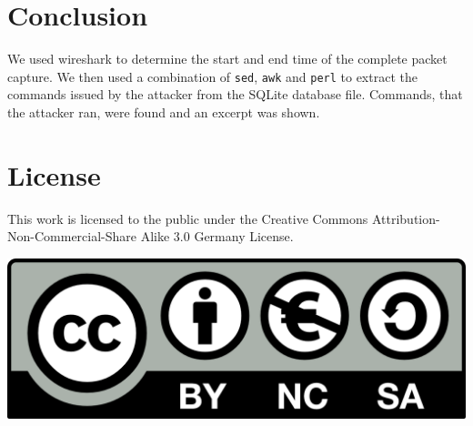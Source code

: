 \documentclass[a4paper,
    11pt,
    normalheadings,
    parindent,
    UKenglish,
    abstracton,
    ]{scrartcl}
\begin{document}
\section{Conclusion}

We used wireshark to determine the start and end time of the complete packet capture.
We then used a combination of \texttt{sed}, \texttt{awk} and \texttt{perl} to extract the commands issued by the attacker from the SQLite database file.
Commands, that the attacker ran, were found and an excerpt was shown.

% 
% 
% 
%
%

\section*{License}
This work is licensed to the public under the Creative Commons Attribution-Non-Commercial-Share Alike 3.0 Germany License.
\begin{center}\includegraphics{bin/by-nc-sa-eu.png}\end{center}
\end{document}
